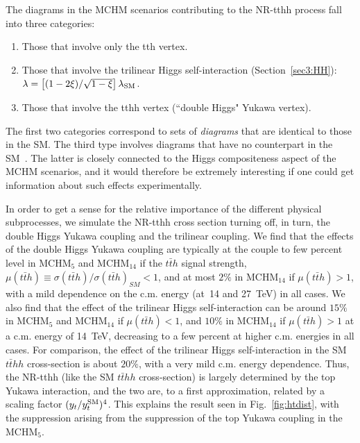 \label{NRtth}
The diagrams in the MCHM scenarios contributing to the NR-tthh process
fall into three categories:
%
\begin{enumerate}
\item Those that involve only the tth vertex.
\item Those that involve the trilinear Higgs self-interaction (Section~\ref{sec3:HH}):
$\lambda = \left[ (1 - 2 \xi)/\sqrt{1 - \xi} \right] \lambda_{\rm
SM}$.
\item Those that involve the tthh vertex (``double Higgs" Yukawa vertex).
\end{enumerate}
%
The first two categories correspond to sets of \textit{diagrams} that
are identical to those in the SM. The third type involves diagrams
that have no counterpart in the SM~\cite{Contino:2012xk}.  The latter
is closely connected to the Higgs compositeness aspect of the MCHM
scenarios, and it would therefore be extremely interesting if one
could get information about such effects experimentally.

In order to get a sense for the relative importance of the different
physical subprocesses, we simulate the NR-tthh cross section
turning off, in turn, the double Higgs Yukawa coupling and the trilinear
coupling.  We find that the effects of the double Higgs Yukawa coupling are
typically at the couple to few percent level in MCHM$_5$ and MCHM$_{14}$ if the $t\bar{t}h$ signal strength,
$\mu(t\bar{t}h) \equiv \sigma(t\bar{t}h)/{\sigma(t\bar{t}h)}_{SM} < 1$, 
and at most $2\%$ in MCHM$_{14}$ if $\mu(t\bar{t}h) > 1$, with a mild dependence
on the c.m. energy (at~14 and 27~TeV) in all cases.
We also find that the effect of the trilinear Higgs self-interaction
can be around $15\%$ in MCHM$_5$ and MCHM$_{14}$ if $\mu(t\bar{t}h) < 1$, and $10\%$ in MCHM$_{14}$ if $\mu(t\bar{t}h) > 1$ at a c.m. energy of 14~TeV, decreasing to a few
percent at higher c.m. energies in all cases.  For comparison, the effect of the
trilinear Higgs self-interaction in the SM $t\bar{t}hh$ cross-section
is about $20\%$, with a very mild c.m. energy dependence.  Thus, the
NR-tthh (like the SM $t\bar{t}hh$ cross-section) is largely determined
by the top Yukawa interaction, and the two are, to a first
approximation, related by a scaling factor $(y_t / y_t^ {\rm SM})^4$.
This explains the result seen in Fig.~\ref{fig:htdist}, with the
suppression arising from the suppression of the top Yukawa coupling in
the MCHM$_5$.


